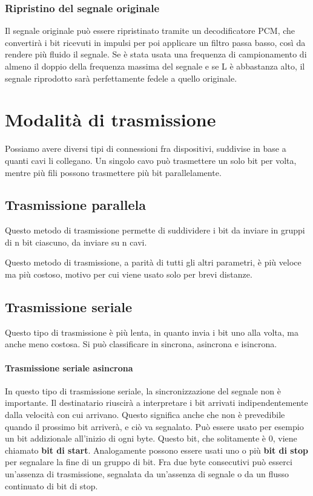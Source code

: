         \subsubsection{Ripristino del segnale originale}
            Il segnale originale può essere ripristinato tramite un decodificatore PCM, che convertirà i bit ricevuti in impulsi per poi applicare un filtro passa basso, così da rendere più fluido il segnale. Se è stata usata una frequenza di campionamento di almeno il doppio della frequenza massima del segnale e se L è abbastanza alto, il segnale riprodotto sarà perfettamente fedele a quello originale.
            
\section{Modalità di trasmissione}
    Possiamo avere diversi tipi di connessioni fra dispositivi, suddivise in base a quanti cavi li collegano. Un singolo cavo può trasmettere un solo bit per volta, mentre più fili possono trasmettere più bit parallelamente.
    
    \subsection{Trasmissione parallela}
        Questo metodo di trasmissione permette di suddividere i bit da inviare in gruppi di n bit ciascuno, da inviare su n cavi.
        
        Questo metodo di trasmissione, a parità di tutti gli altri parametri, è più veloce ma più costoso, motivo per cui viene usato solo per brevi distanze.
        
    \subsection{Trasmissione seriale}
        Questo tipo di trasmissione è più lenta, in quanto invia i bit uno alla volta, ma anche meno costosa. Si può classificare in sincrona, asincrona e isincrona.
        
        \paragraph{Trasmissione seriale asincrona}
            In questo tipo di trasmissione seriale, la sincronizzazione del segnale non è importante. Il destinatario riuscirà a interpretare i bit arrivati indipendentemente dalla velocità con cui arrivano. Questo significa anche che non è prevedibile quando il prossimo bit arriverà, e ciò va segnalato. Può essere usato per esempio un bit addizionale all'inizio di ogni byte. Questo bit, che solitamente è 0, viene chiamato \textbf{bit di start}. Analogamente possono essere usati uno o più \textbf{bit di stop} per segnalare la fine di un gruppo di bit. Fra due byte consecutivi può esserci un'assenza di trasmissione, segnalata da un'assenza di segnale o da un flusso continuato di bit di stop.
            
